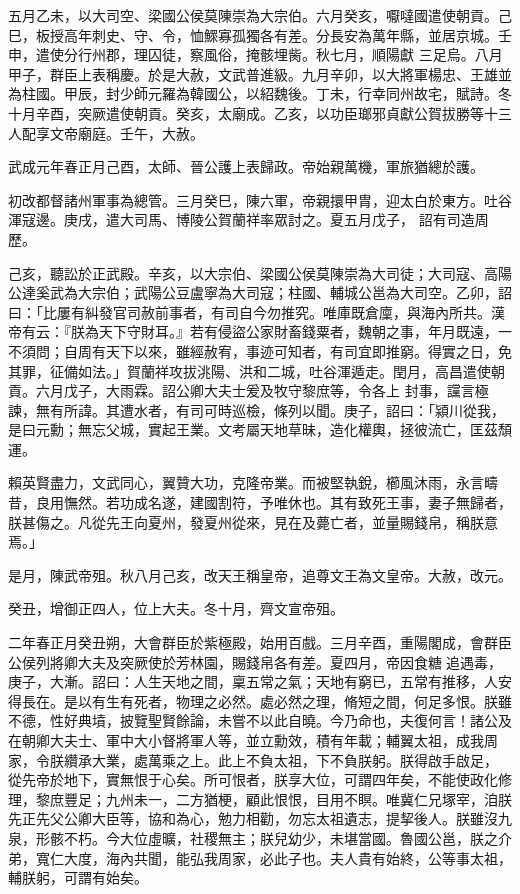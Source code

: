 \begin{pinyinscope}
 五月乙未，以大司空、梁國公侯莫陳崇為大宗伯。六月癸亥，嚈噠國遣使朝貢。己巳，板授高年刺史、守、令，恤鰥寡孤獨各有差。分長安為萬年縣，並居京城。壬申，遣使分行州郡，理囚徒，察風俗，掩骸埋胔。秋七月，順陽獻
 三足烏。八月甲子，群臣上表稱慶。於是大赦，文武普進級。九月辛卯，以大將軍楊忠、王雄並為柱國。甲辰，封少師元羅為韓國公，以紹魏後。丁未，行幸同州故宅，賦詩。冬十月辛酉，突厥遣使朝貢。癸亥，太廟成。乙亥，以功臣瑯邪貞獻公賀拔勝等十三人配享文帝廟庭。壬午，大赦。



 武成元年春正月己酉，太師、晉公護上表歸政。帝始親萬機，軍旅猶總於護。



 初改都督諸州軍事為總管。三月癸巳，陳六軍，帝親擐甲胄，迎太白於東方。吐谷渾寇邊。庚戌，遣大司馬、博陵公賀蘭祥率眾討之。夏五月戊子，
 詔有司造周歷。



 己亥，聽訟於正武殿。辛亥，以大宗伯、梁國公侯莫陳崇為大司徒；大司寇、高陽公達奚武為大宗伯；武陽公豆盧寧為大司寇；柱國、輔城公邕為大司空。乙卯，詔曰：「比屢有糾發官司赦前事者，有司自今勿推究。唯庫既倉廩，與海內所共。漢帝有云：『朕為天下守財耳。』若有侵盜公家財畜錢粟者，魏朝之事，年月既遠，一不須問；自周有天下以來，雖經赦宥，事迹可知者，有司宜即推窮。得實之日，免其罪，征備如法。」賀蘭祥攻拔洮陽、洪和二城，吐谷渾遁走。閏月，高昌遣使朝貢。六月戊子，大雨霖。詔公卿大夫士爰及牧守黎庶等，令各上
 封事，讜言極諫，無有所諱。其遭水者，有司可時巡檢，條列以聞。庚子，詔曰：「潁川從我，是曰元勳；無忘父城，實起王業。文考屬天地草昧，造化權輿，拯彼流亡，匡茲頹運。



 賴英賢盡力，文武同心，翼贊大功，克隆帝業。而被堅執銳，櫛風沐雨，永言疇昔，良用憮然。若功成名遂，建國割符，予唯休也。其有致死王事，妻子無歸者，朕甚傷之。凡從先王向夏州，發夏州從來，見在及薨亡者，並量賜錢帛，稱朕意焉。」



 是月，陳武帝殂。秋八月己亥，改天王稱皇帝，追尊文王為文皇帝。大赦，改元。



 癸丑，增御正四人，位上大夫。冬十月，齊文宣帝殂。



 二年春正月癸丑朔，大會群臣於紫極殿，始用百戲。三月辛酉，重陽閣成，會群臣公侯列將卿大夫及突厥使於芳林園，賜錢帛各有差。夏四月，帝因食糖追遇毒，庚子，大漸。詔曰：人生天地之間，稟五常之氣；天地有窮已，五常有推移，人安得長在。是以有生有死者，物理之必然。處必然之理，脩短之間，何足多恨。朕雖不德，性好典墳，披覽聖賢餘論，未嘗不以此自曉。今乃命也，夫復何言！諸公及在朝卿大夫士、軍中大小督將軍人等，並立勳效，積有年載；輔翼太祖，成我周家，令朕纘承大業，處萬乘之上。此上不負太祖，下不負朕躬。朕得啟手啟足，
 從先帝於地下，實無恨于心矣。所可恨者，朕享大位，可謂四年矣，不能使政化修理，黎庶豐足；九州未一，二方猶梗，顧此恨恨，目用不瞑。唯冀仁兄塚宰，洎朕先正先父公卿大臣等，協和為心，勉力相勸，勿忘太祖遺志，提挈後人。朕雖沒九泉，形骸不朽。今大位虛曠，社稷無主；朕兒幼少，未堪當國。魯國公邕，朕之介弟，寬仁大度，海內共聞，能弘我周家，必此子也。夫人貴有始終，公等事太祖，輔朕躬，可謂有始矣。




\end{pinyinscope}
